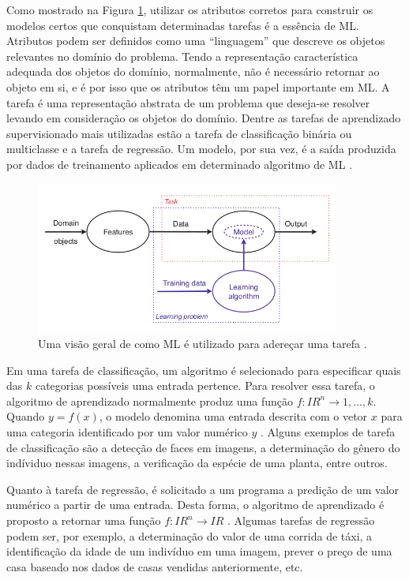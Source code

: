 Como mostrado na Figura \ref{fig:tasks}, utilizar os atributos corretos para construir os modelos certos que conquistam determinadas tarefas é a essência de ML. Atributos podem ser definidos como uma ``linguagem'' que descreve os objetos relevantes no domínio do problema. Tendo a representação característica adequada dos objetos do domínio, normalmente, não é necessário retornar ao objeto em si, e é por isso que os atributos têm um papel importante em ML. A tarefa é uma representação abstrata de um problema que deseja-se resolver levando em consideração os objetos do domínio. Dentre as tarefas de aprendizado supervisionado mais utilizadas estão a tarefa de classificação binária ou multiclasse e a tarefa de regressão. Um modelo, por sua vez, é a saída produzida por dados de treinamento aplicados em determinado algoritmo de ML \cite{flach}.

\begin{figure}[H]
\centering
\includegraphics[height=5cm]{imgs/tasks}
\caption{Uma visão geral de como ML é utilizado para adereçar uma tarefa \cite{flach}.}
\label{fig:tasks}
\end{figure}


Em uma tarefa de classificação, um algoritmo é selecionado para especificar quais das $k$ categorias possíveis uma entrada pertence. Para resolver essa tarefa, o algoritmo de aprendizado normalmente produz uma função $f : I\!R^n \rightarrow {1,...,k}$. Quando $y = f(x)$, o modelo denomina uma entrada descrita com o vetor $x$ para uma categoria identificado por um valor numérico $y$ \cite{goodfellow}. Alguns exemplos de tarefa de classificação são a detecção de faces em imagens, a determinação do gênero do indíviduo nessas imagens, a verificação da espécie de uma planta, entre outros.

Quanto à tarefa de regressão, é solicitado a um programa a predição de um valor numérico a partir de uma entrada. Desta forma, o algoritmo de aprendizado é proposto a retornar uma função $f : I\!R^n \rightarrow I\!R$ \cite{goodfellow}. Algumas tarefas de regressão podem ser, por exemplo, a determinação do valor de uma corrida de táxi, a identificação da idade de um indivíduo em uma imagem, prever o preço de uma casa baseado nos dados de casas vendidas anteriormente, etc.

